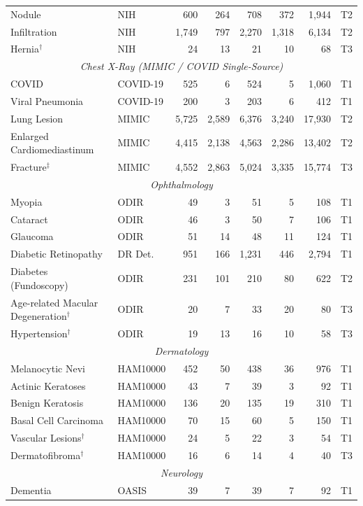 \documentclass[12pt,a4paper]{report}
\begin{document}
\begin{longtable}{@{}llrrrrrr@{}}
Nodule & NIH & 600 & 264 & 708 & 372 & 1,944 & T2 \\
Infiltration & NIH & 1,749 & 797 & 2,270 & 1,318 & 6,134 & T2 \\
Hernia$^\dagger$ & NIH & 24 & 13 & 21 & 10 & 68 & T3 \\
\midrule
\multicolumn{8}{c}{\textit{Chest X-Ray (MIMIC / COVID Single-Source)}} \\
\midrule
COVID & COVID-19 & 525 & 6 & 524 & 5 & 1,060 & T1 \\
Viral Pneumonia & COVID-19 & 200 & 3 & 203 & 6 & 412 & T1 \\
Lung Lesion & MIMIC & 5,725 & 2,589 & 6,376 & 3,240 & 17,930 & T2 \\
\makecell[l]{Enlarged\\Cardiomediastinum} & MIMIC & 4,415 & 2,138 & 4,563 & 2,286 & 13,402 & T2 \\
Fracture$^\ddagger$ & MIMIC & 4,552 & 2,863 & 5,024 & 3,335 & 15,774 & T3 \\
\midrule
\multicolumn{8}{c}{\textit{Ophthalmology}} \\
\midrule
Myopia & ODIR & 49 & 3 & 51 & 5 & 108 & T1 \\
Cataract & ODIR & 46 & 3 & 50 & 7 & 106 & T1 \\
Glaucoma & ODIR & 51 & 14 & 48 & 11 & 124 & T1 \\
Diabetic Retinopathy & DR Det. & 951 & 166 & 1,231 & 446 & 2,794 & T1 \\
Diabetes (Fundoscopy) & ODIR & 231 & 101 & 210 & 80 & 622 & T2 \\
\makecell[l]{Age-related Macular\\Degeneration$^\dagger$} & ODIR & 20 & 7 & 33 & 20 & 80 & T3 \\
Hypertension$^\dagger$ & ODIR & 19 & 13 & 16 & 10 & 58 & T3 \\
\midrule
\multicolumn{8}{c}{\textit{Dermatology}} \\
\midrule
Melanocytic Nevi & HAM10000 & 452 & 50 & 438 & 36 & 976 & T1 \\
Actinic Keratoses & HAM10000 & 43 & 7 & 39 & 3 & 92 & T1 \\
Benign Keratosis & HAM10000 & 136 & 20 & 135 & 19 & 310 & T1 \\
Basal Cell Carcinoma & HAM10000 & 70 & 15 & 60 & 5 & 150 & T1 \\
Vascular Lesions$^\dagger$ & HAM10000 & 24 & 5 & 22 & 3 & 54 & T1 \\
Dermatofibroma$^\dagger$ & HAM10000 & 16 & 6 & 14 & 4 & 40 & T3 \\
\midrule
\multicolumn{8}{c}{\textit{Neurology}} \\
\midrule
Dementia & OASIS & 39 & 7 & 39 & 7 & 92 & T1 \\
\bottomrule
\end{longtable}
\endgroup
\end{document}
